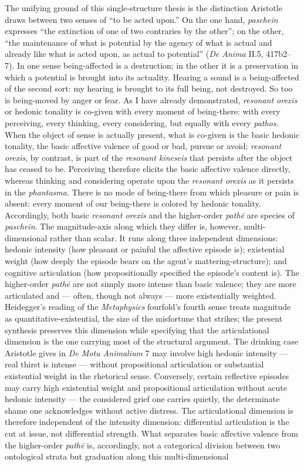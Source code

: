 The unifying ground of this single-structure thesis is the distinction Aristotle draws between two senses of ``to be acted upon.'' On the one hand, \textit{paschein} expresses ``the extinction of one of two contraries by the other''; on the other, ``the maintenance of what is potential by the agency of what is actual and already like what is acted upon, as actual to potential'' (\textit{De Anima} II.5, 417b2--7). In one sense being-affected is a destruction; in the other it is a preservation in which a potential is brought into its actuality. Hearing a sound is a being-affected of the second sort: my hearing is brought to its full being, not destroyed. So too is being-moved by anger or fear. As I have already demonstrated, \textit{resonant orexis} or hedonic tonality is co-given with every moment of being-there: with every perceiving, every thinking, every considering, but equally with every \textit{pathos}. When the object of sense is actually present, what is co-given is the basic hedonic tonality, the basic affective valence of good or bad, pursue or avoid; \textit{resonant orexis}, by contrast, is part of the \textit{resonant kineseis} that persists after the object has ceased to be. Perceiving therefore elicits the basic affective valence directly, whereas thinking and considering operate upon the \textit{resonant orexis} as it persists in the \textit{phantasma}. There is no mode of being-there from which pleasure or pain is absent: every moment of our being-there is colored by hedonic tonality. Accordingly, both basic \textit{resonant orexis} and the higher-order \textit{pathē} are species of \textit{paschein}. The magnitude-axis along which they differ is, however, multi-dimensional rather than scalar. It runs along three independent dimensions: hedonic intensity (how pleasant or painful the affective episode is); existential weight (how deeply the episode bears on the agent's mattering-structure); and cognitive articulation (how propositionally specified the episode's content is). The higher-order \textit{pathē} are not simply more intense than basic valence; they are more articulated and --- often, though not always --- more existentially weighted. Heidegger's reading of the \textit{Metaphysics} fourfold's fourth sense treats magnitude as quantitative-existential, the size of the misfortune that strikes; the present synthesis preserves this dimension while specifying that the articulational dimension is the one carrying most of the structural argument. The drinking case Aristotle gives in \textit{De Motu Animalium} 7 may involve high hedonic intensity --- real thirst is intense --- without propositional articulation or substantial existential weight in the rhetorical sense. Conversely, certain reflective episodes may carry high existential weight and propositional articulation without acute hedonic intensity --- the considered grief one carries quietly, the determinate shame one acknowledges without active distress. The articulational dimension is therefore independent of the intensity dimension: differential articulation is the cut at issue, not differential strength. What separates basic affective valence from the higher-order \textit{pathē} is, accordingly, not a categorical division between two ontological strata but graduation along this multi-dimensional 